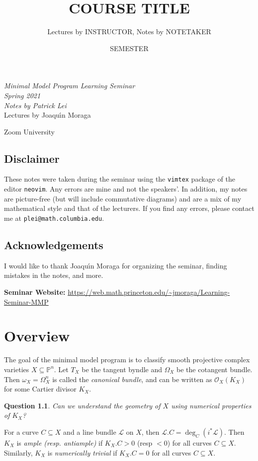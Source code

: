 \documentclass[leqno, openany]{memoir}
\title{COURSE TITLE}
\author{Lectures by INSTRUCTOR, Notes by NOTETAKER}
\date{SEMESTER}
\newtheorem{quest}[thm]{Question}
\theoremstyle{definition}
\theoremstyle{remark}
\theoremstyle{plain}
\theoremstyle{definition}
\theoremstyle{remark}
\renewcommand{\P}{\mathbb{P}}
\newcommand{\msc}[1]{\mathscr{#1}}
\newcommand*{\titleSW}
    {\begingroup%
    \raggedleft
    \vspace*{\baselineskip}
    {\Huge\itshape Minimal Model Program Learning Seminar \\ Spring 2021}\\[\baselineskip]
    {\large\itshape Notes by Patrick Lei}\\[0.2\textheight]
    {\Large Lectures by Joaqu\'{\i}n Moraga}\par
    \vfill
    {\Large \sffamily Zoom University}
    \vspace*{\baselineskip}
\endgroup}
\begin{document}
    
\begin{titlingpage}
\titleSW
\end{titlingpage}

\thispagestyle{empty}
\section*{Disclaimer}%
\label{sec:disclaimer}

These notes were taken during the seminar using the \texttt{vimtex} package of the editor \texttt{neovim}. 
Any errors are mine and not the speakers'. 
In addition, my notes are picture-free (but will include commutative diagrams) and are a mix of my mathematical style and that of the lecturers.
If you find any errors, please contact me at \texttt{plei@math.columbia.edu}.

\section*{Acknowledgements}%
\label{sec:acknowledgements}

I would like to thank Joaqu\'{\i}n Moraga for organizing the seminar, finding mistakes in the notes, and more.

\vspace*{1cm}

\noindent\textbf{Seminar Website:}  \url{https://web.math.princeton.edu/~jmoraga/Learning-Seminar-MMP}
\newpage


\tableofcontents

\chapter{Overview}%
\label{cha:overview}

The goal of the minimal model program is to classify smooth projective complex varieties $X \subseteq \P^n$. Let $T_X$ be the tangent byndle and $\Omega_X$ be the cotangent bundle. Then $\omega_X = \Omega_X^n$ is called the \textit{canonical bundle}, and can be written as $\msc{O}_X(K_X)$ for some Cartier divisor $K_X$.

\begin{quest}
    Can we understand the geometry of $X$ using numerical properties of $K_X$?
\end{quest}

For a curve $C \subseteq X$ and a line bundle $\msc{L}$ on $X$, then $\msc{L}.C = \deg_C(i^* \msc{L})$. Then $K_X$ is \textit{ample (resp. antiample)} if $K_X . C > 0$ (resp $<0$) for all curves $C \subseteq X$. Similarly, $K_X$ is \textit{numerically trivial} if $K_X . C = 0$ for all curves $C \subseteq X$.
\end{document}
